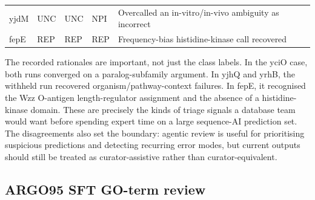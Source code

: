 \documentclass[
  11pt,
]{article}
\begin{document}
\begin{longtable}[]{@{}lllll@{}}
\begin{minipage}[t]{0.17\columnwidth}
yjdM\strut
\end{minipage} & \begin{minipage}[t]{0.17\columnwidth}\raggedright
UNC\strut
\end{minipage} & \begin{minipage}[t]{0.17\columnwidth}\raggedright
UNC\strut
\end{minipage} & \begin{minipage}[t]{0.17\columnwidth}\raggedright
NPI\strut
\end{minipage} & \begin{minipage}[t]{0.17\columnwidth}\raggedright
Overcalled an in-vitro/in-vivo ambiguity as incorrect\strut
\end{minipage}\tabularnewline
\begin{minipage}[t]{0.17\columnwidth}\raggedright
fepE\strut
\end{minipage} & \begin{minipage}[t]{0.17\columnwidth}\raggedright
REP\strut
\end{minipage} & \begin{minipage}[t]{0.17\columnwidth}\raggedright
REP\strut
\end{minipage} & \begin{minipage}[t]{0.17\columnwidth}\raggedright
REP\strut
\end{minipage} & \begin{minipage}[t]{0.17\columnwidth}\raggedright
Frequency-bias histidine-kinase call recovered\strut
\end{minipage}\tabularnewline
\bottomrule
\end{longtable}

The recorded rationales are important, not just the class labels. In the
yciO case, both runs converged on a paralog-subfamily argument. In yjhQ
and yrhB, the withheld run recovered organism/pathway-context failures.
In fepE, it recognised the Wzz O-antigen length-regulator assignment and
the absence of a histidine-kinase domain. These are precisely the kinds
of triage signals a database team would want before spending expert time
on a large sequence-AI prediction set. The disagreements also set the
boundary: agentic review is useful for prioritising suspicious
predictions and detecting recurring error modes, but current outputs
should still be treated as curator-assistive rather than
curator-equivalent.

\hypertarget{argo95-sft-go-term-review}{%
\subsection{ARGO95 SFT GO-term
review}\label{argo95-sft-go-term-review}}
\end{document}
